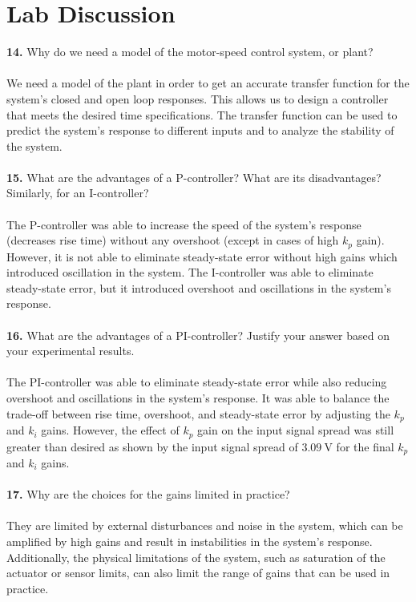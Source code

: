 ﻿\documentclass[12pt]{article}
\begin{document}
\section{Lab Discussion}
\textbf{14.} Why do we need a model of the motor-speed control system, or plant?\\\\
We need a model of the plant in order to get an accurate transfer function for the system's closed and open loop responses. This allows us to design a controller that meets the desired time specifications. The transfer function can be used to predict the system's response to different inputs and to analyze the stability of the system.\\\\
\textbf{15.} What are the advantages of a P-controller? What are its disadvantages? Similarly, for an I-controller?\\\\
The P-controller was able to increase the speed of the system's response (decreases rise time) without any overshoot (except in cases of high $k_p$ gain). However, it is not able to eliminate steady-state error without high gains which introduced oscillation in the system. The I-controller was able to eliminate steady-state error, but it introduced overshoot and oscillations in the system's response.\\\\
\textbf{16.} What are the advantages of a PI-controller? Justify your answer based on your experimental results.\\\\
The PI-controller was able to eliminate steady-state error while also reducing overshoot and oscillations in the system's response. It was able to balance the trade-off between rise time, overshoot, and steady-state error by adjusting the $k_p$ and $k_i$ gains. However, the effect of $k_p$ gain on the input signal spread was still greater than desired as shown by the input signal spread of $3.09~\mathrm{V}$ for the final $k_p$ and $k_i$ gains.\\\\
\textbf{17.} Why are the choices for the gains limited in practice?\\\\
They are limited by external disturbances and noise in the system, which can be amplified by high gains and result in instabilities in the system's response. Additionally, the physical limitations of the system, such as saturation of the actuator or sensor limits, can also limit the range of gains that can be used in practice.
\end{document}
